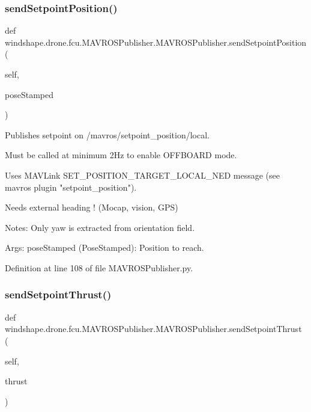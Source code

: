 \subsubsection{\texorpdfstring{send\+Setpoint\+Position()}{sendSetpointPosition()}}
{\footnotesize\ttfamily def windshape.\+drone.\+fcu.\+M\+A\+V\+R\+O\+S\+Publisher.\+M\+A\+V\+R\+O\+S\+Publisher.\+send\+Setpoint\+Position (\begin{DoxyParamCaption}\item[{}]{self,  }\item[{}]{pose\+Stamped }\end{DoxyParamCaption})}

\begin{DoxyVerb}Publishes setpoint on /mavros/setpoint_position/local.

Must be called at minimum 2Hz to enable OFFBOARD mode.

Uses MAVLink SET_POSITION_TARGET_LOCAL_NED message (see mavros
plugin "setpoint_position").

Needs external heading ! (Mocap, vision, GPS)

Notes:
    Only yaw is extracted from orientation field.

Args:
    poseStamped (PoseStamped): Position to reach.
\end{DoxyVerb}
 

Definition at line 108 of file M\+A\+V\+R\+O\+S\+Publisher.\+py.

\mbox{\label{classwindshape_1_1drone_1_1fcu_1_1_m_a_v_r_o_s_publisher_1_1_m_a_v_r_o_s_publisher_acd8b2f7beafc7c3d9cfc313cedf49621}} 
\subsubsection{\texorpdfstring{send\+Setpoint\+Thrust()}{sendSetpointThrust()}}
{\footnotesize\ttfamily def windshape.\+drone.\+fcu.\+M\+A\+V\+R\+O\+S\+Publisher.\+M\+A\+V\+R\+O\+S\+Publisher.\+send\+Setpoint\+Thrust (\begin{DoxyParamCaption}\item[{}]{self,  }\item[{}]{thrust }\end{DoxyParamCaption})}

